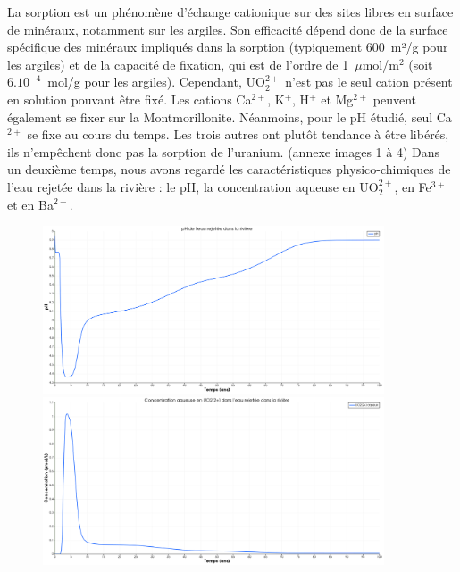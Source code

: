 \documentclass{article}
\begin{document}
La sorption est un phénomène d’échange cationique sur des sites libres en surface de minéraux, notamment sur les argiles. Son efficacité dépend donc de la surface spécifique des minéraux impliqués dans la sorption (typiquement 600~m²/g pour les argiles) et de la capacité de fixation, qui est de l’ordre de 1~$\mu$mol/m$^2$ (soit $6 . 10^{-4}$~mol/g pour les argiles). Cependant, UO$_2^{2+}$ n’est pas le seul cation présent en solution pouvant être fixé. Les cations Ca$^{2+}$, K$^{+}$, H$^{+}$ et Mg$^{2+}$ peuvent également se fixer sur la Montmorillonite. Néanmoins, pour le pH étudié, seul Ca$^{2+}$ se fixe au cours du temps. Les trois autres ont plutôt tendance à être libérés, ils n’empêchent donc pas la sorption de l’uranium. (annexe images 1 à 4)
Dans un deuxième temps, nous avons regardé les caractéristiques physico-chimiques de l’eau rejetée dans la rivière : le pH, la concentration aqueuse en UO$_2^{2+}$, en Fe$^{3+}$ et en Ba$^{2+}$.

\begin{figure}[H]
    \centering
    \begin{minipage}{0.5\textwidth}
        \centering
        \includegraphics[width=0.9\textwidth]{III_B_2_5.png} 
        \caption{}
        \label{fig:pH_sable_Base}
    \end{minipage}\hfill
    \begin{minipage}{0.5\textwidth}
        \centering
        \includegraphics[width=0.9\textwidth]{III_B_2_6.png} 
        \caption{}
        \label{fig:UO2_riviere_sable_base}
    \end{minipage}
\end{figure}
\end{document}
